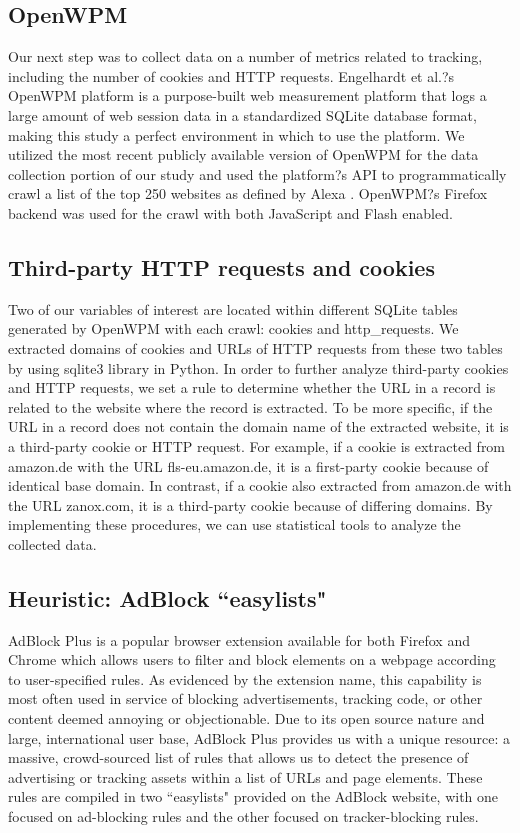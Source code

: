 \documentclass[journal]{IEEEtran}
\begin{document}
\subsection{OpenWPM}


Our next step was to collect data on a number of metrics related to tracking, including the number of cookies and HTTP requests. Engelhardt et al.?s OpenWPM platform is a purpose-built web measurement platform that logs a large amount of web session data in a standardized SQLite database format, making this study a perfect environment in which to use the platform. We utilized the most recent publicly available version of OpenWPM for the data collection portion of our study and used the platform?s API to programmatically crawl a list of the top 250 websites as defined by Alexa \cite{Alexa}. OpenWPM?s Firefox backend was used for the crawl with both JavaScript and Flash enabled.


\subsection{Third-party HTTP requests and cookies}

Two of our variables of interest are located within different SQLite tables generated by OpenWPM with each crawl: cookies and http\_requests. We extracted domains of cookies and URLs of HTTP requests from these two tables by using sqlite3 library in Python. In order to further analyze third-party cookies and HTTP requests, we set a rule to determine whether the URL in a record is related to the website where the record is extracted. To be more specific, if the URL in a record does not contain the domain name of the extracted website, it is a third-party cookie or HTTP request. For example, if a cookie is extracted from amazon.de with the URL fls-eu.amazon.de, it is a first-party cookie because of identical base domain. In contrast, if a cookie also extracted from amazon.de with the URL zanox.com, it is a third-party cookie because of differing domains. By implementing these procedures, we can use statistical tools to analyze the collected data.


\subsection{Heuristic: AdBlock ``easylists"}

AdBlock Plus \cite{adblock} is a popular browser extension available for both Firefox and Chrome which allows users to filter and block elements on a webpage according to user-specified rules. As evidenced by the extension name, this capability is most often used in service of blocking advertisements, tracking code, or other content deemed annoying or objectionable. Due to its open source nature and large, international user base, AdBlock Plus provides us with a unique resource: a massive, crowd-sourced list of rules that allows us to detect the presence of advertising or tracking assets within a list of URLs and page elements. These rules are compiled in two ``easylists" \cite{easylist} provided on the AdBlock website, with one focused on ad-blocking rules and the other focused on tracker-blocking rules.
\end{document}
